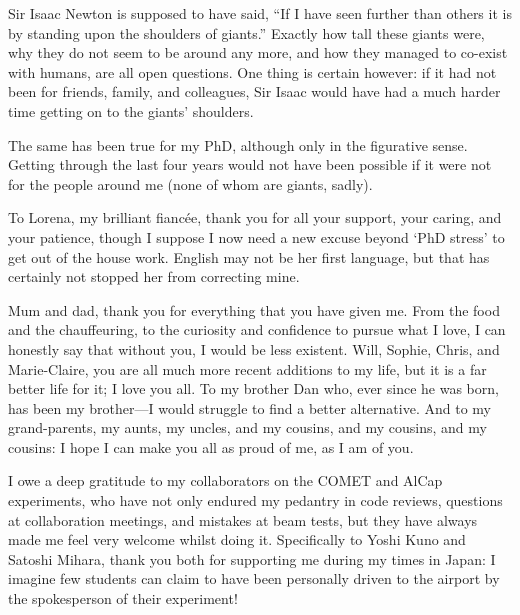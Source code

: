 \begin{acknowledgements}
Sir Isaac Newton is supposed to have said, ``If I have seen further than others it is by standing upon the shoulders of giants.''  
Exactly how tall these giants were, why they do not seem to be around any more, and how they managed to co-exist with humans, are all open questions.
One thing is certain however: if it had not been for friends, family, and colleagues, Sir Isaac would have had a much harder time getting on to the giants' shoulders.

The same has been true for my PhD, although only in the figurative sense.
Getting through the last four years would not have been possible if it were not for the people around me (none of whom are giants, sadly).

To Lorena, my brilliant fianc\'{e}e, thank you for all your support, your caring, and your patience, though I suppose I now need a new excuse beyond `PhD stress' to get out of the house work.
English may not be her first language, but that has certainly not stopped her from correcting mine.

Mum and dad, thank you for everything that you have given me. From the food and the chauffeuring, to the curiosity and confidence to pursue what I love, 
I can honestly say that without you, I would be less existent.
Will, Sophie, Chris, and Marie-Claire, you are all much more recent additions to my life, but it is a far better life for it; I love you all.
To my brother Dan who, ever since he was born, has been my brother---I would struggle to find a better alternative.
And to my grand-parents, my aunts, my uncles, and my cousins, and my cousins, and my cousins:  I hope I can make you all as proud of me, as I am of you.

I owe a deep gratitude to my collaborators on the COMET and AlCap experiments, who have not only endured my pedantry in code reviews, questions at collaboration meetings, and mistakes at beam tests, but they have always made me feel very welcome whilst doing it. 
Specifically to Yoshi Kuno and Satoshi Mihara, thank you both for supporting me during my times in Japan:
I imagine few students can claim to have been personally driven to the airport by the spokesperson of their experiment!


\end{acknowledgements}
